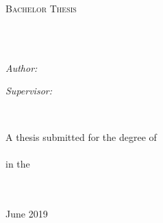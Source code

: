 \documentclass[
12pt, %
english, %
onehalfspacing, %
headsepline, %
]{MastersDoctoralThesis} %
\author{Sami \textsc{arja}} %
\begin{document}
\frontmatter %

\pagestyle{plain} %


\begin{titlepage}
\begin{center}

\vspace*{.06\textheight}
{\scshape\LARGE \univname\par}\vspace{1.5cm} %
\textsc{\Large Bachelor Thesis}\\[0.5cm] %

\HRule \\[0.4cm] %
{\huge \bfseries \ttitle\par}\vspace{0.4cm} %
\HRule \\[1.5cm] %
 
\begin{minipage}[t]{0.4\textwidth}
\begin{flushleft} \large
\emph{Author:}\\
\href{https://github.com/samiarja}{\authorname} %
\end{flushleft}
\end{minipage}
\begin{minipage}[t]{0.4\textwidth}
\begin{flushright} \large
\emph{Supervisor:} \\
\href{https://www.westernsydney.edu.au/staff_profiles/uws_profiles/associate_professor_gu_fang}{\supname} %
\end{flushright}
\end{minipage}\\[3cm]
 
\vfill

\large A thesis submitted for the degree of\\ \degreename\\[0.2cm] %
in the\\[0.4cm]
\groupname\\\deptname\\[1cm] %
 
\vfill

June 2019\\[4cm] %
 
\vfill
\end{center}
\end{titlepage}
\end{document}
